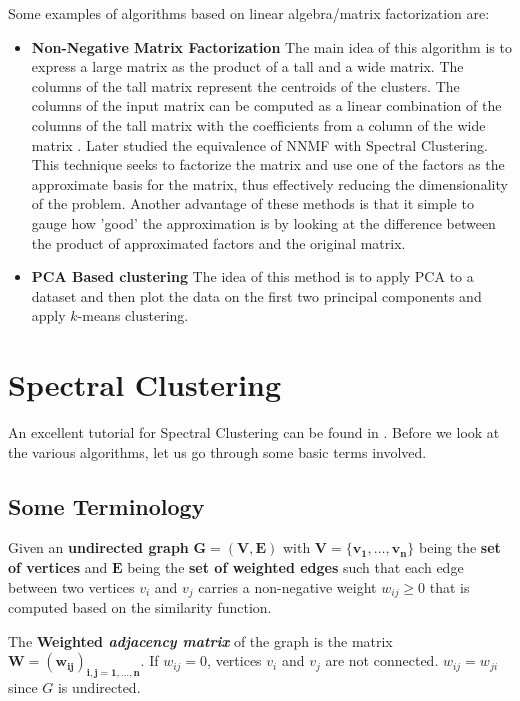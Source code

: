 \documentclass[10pt,a4paper, nocenter]{report}
\begin{document}
    Some examples of algorithms based on linear algebra/matrix factorization are:
    \begin{itemize}
        \item \textbf{Non-Negative Matrix Factorization} The main idea of this algorithm is to express a large matrix as the product of a tall and a wide matrix. The columns of the tall matrix represent the centroids of the clusters. The columns of the input matrix can be computed as a linear combination of the columns of the tall matrix with the coefficients from a column of the wide matrix \cite{Lawton-1971-nnmf} \cite{Paatero1991-nnmf}. Later \cite{Ding05-nnmf-spectral} studied the equivalence of NNMF with Spectral Clustering. This technique seeks to factorize the matrix and use one of the factors as the approximate basis for the matrix, thus effectively reducing the dimensionality of the problem. Another advantage of these methods is that it simple to gauge how 'good' the approximation is by looking at the difference between the product of approximated factors and the original matrix.
        \item \textbf{PCA Based clustering} The idea of this method is to apply PCA to a dataset and then plot the data on the first two principal components and apply $k$-means clustering. \cite{Zhang-2108-pca} 
    \end{itemize}

    


    \chapter{Spectral Clustering}
    An excellent tutorial for Spectral Clustering can be found in \cite{Luxburg2007}. Before we look at the various algorithms, let us go through some basic terms involved.

    \section{Some Terminology}

        Given an \textbf{undirected graph} $\mathbf{G=(V,E)}$ with $\mathbf{V=\{v_{1},\dots,v_{n}\}}$ being the \textbf{set of vertices} and $\mathbf{E}$ being the \textbf{set of weighted edges} such that each edge between two vertices $v_{i}$ and $v_{j}$ carries a non-negative weight $w_{ij} \ge 0$ that is computed based on the similarity function.

        The \textbf{Weighted \textit{adjacency matrix}} of the graph is the matrix $\mathbf{W=(w_{ij})_{i,j=1,\dots,n}}$. If $w_{ij}=0$, vertices $v_{i}$ and $v_{j}$ are not connected. $w_{ij}=w_{ji}$ since $G$ is undirected. 
\end{document}
